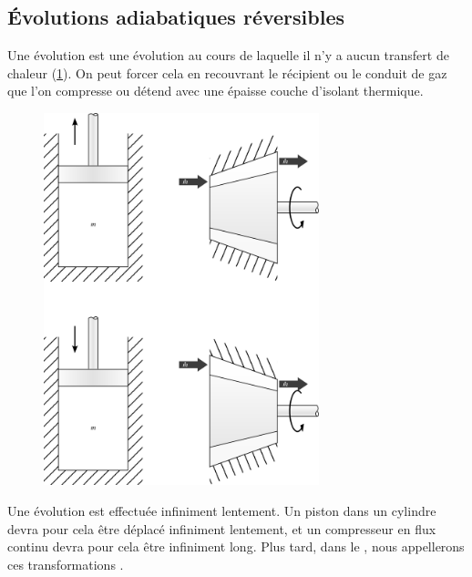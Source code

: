 	\subsection{Évolutions adiabatiques réversibles}
	\label{ch_gp_isentropiques}

		Une évolution  est une évolution au cours de laquelle il n’y a aucun transfert de chaleur (\cref{fig_gp_isentropique}). On peut forcer cela en recouvrant le récipient ou le conduit de gaz que l’on compresse ou détend avec une épaisse couche d’isolant thermique.
		
		\begin{figure}
			\begin{center}
				\includegraphics[width=8cm]{images/isentropique.png}
			\end{center}
			\label{fig_gp_isentropique}
		\end{figure}
		
		Une évolution  est effectuée infiniment lentement. Un piston dans un cylindre devra pour cela être déplacé infiniment lentement, et un compresseur en flux continu devra pour cela être infiniment long. Plus tard, dans le \courshuit, nous appellerons ces transformations .
		
